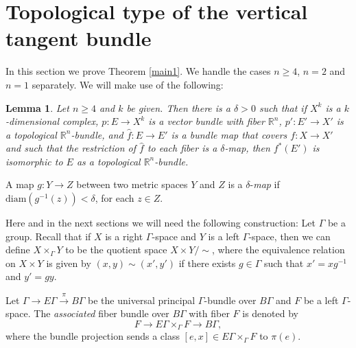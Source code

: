 \documentclass[onecolumn,notitlepage,11pt]{article}
\newcommand{\refer}[1]{\hyperref[#1]{\ref*{#1}}}%
\newcommand{\R}{\mathbb{R}}
\newcommand{\beq}{\begin{equation*}}
\newcommand{\eeq}{\end{equation*}}
\newtheorem{lemma}{Lemma}[section]
\theoremstyle{definition}
\begin{document}
\section{Topological type of the vertical tangent bundle}\label{topotri}
In this section we prove Theorem \refer{main1}. We handle the cases
$n\geq 4$, $n=2$ and $n=1$ separately. 
We will make use of the following:
\begin{lemma}{\cite[Corollary 2.7]{FW91}}\label{coro2.7}
Let $n\geq 4$ and $k$ be given. Then there is a $\delta>0$ such that if
$X^k$ is a $k$-dimensional complex, $p:E\to X^k$ is a vector bundle with fiber
$\R^n$, $p':E'\to X'$ is a topological $\R^n$-bundle, and $\hat{f}:E\to E'$
is a bundle map that covers $f:X\to X'$ and such that the restriction of $\hat{f}$ to each fiber is a
$\delta$-map, then $f^*(E')$ is isomorphic to $E$ as a topological 
$\R^n$-bundle.
\end{lemma}
A map $g:Y\to Z$ between two metric spaces $Y$ and $Z$
is a $\delta$-\textit{map} if $\mbox{diam}(g^{-1}(z))<\delta$, for each $z\in Z$.

Here and in the next sections we will need the following
construction: Let $\Gamma$ be a group. Recall that if $X$ is a 
right $\Gamma$-space and $Y$ is a left $\Gamma$-space, then
we can define $X\times_{\Gamma}Y$ to be the quotient space $X\times Y/\sim$, where the equivalence relation on $X\times Y$ is given by
$(x,y)\sim (x',y')$ if there exists $g\in\Gamma$
such that $x'=xg^{-1}$ and $y'=gy$.

Let $\Gamma\to E\Gamma\xrightarrow{\pi} B\Gamma$ be the
universal principal $\Gamma$-bundle over $B\Gamma$ and $F$ be a left $\Gamma$-space. The 
\textit{associated} fiber bundle over $B\Gamma$ with fiber $F$ is denoted
by 
\beq
F\to E\Gamma\times_{\Gamma}F\to B\Gamma,
\eeq
where the bundle projection sends a class
$[e,x]\in E\Gamma\times_{\Gamma}F$ to $\pi(e)$.
\end{document}
